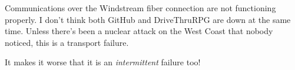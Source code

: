 Communications over the Windstream fiber connection are not functioning
properly. I don't think both GitHub and DriveThruRPG are down at the
same time. Unless there's been a nuclear attack on the West Coast that
nobody noticed, this is a transport failure.

It makes it worse that it is an \emph{intermittent} failure too!
